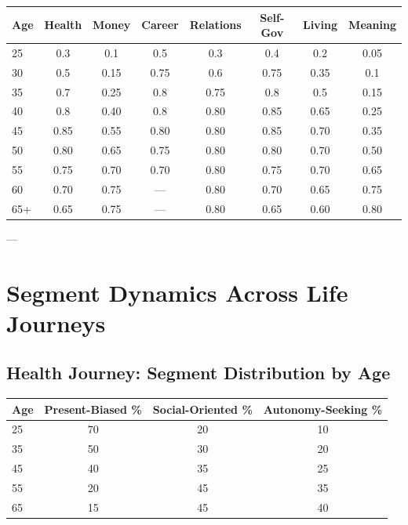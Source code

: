 \begin{center}
\small
\begin{tabular}{@{}p{1.5cm}|ccccccc@{}}
\toprule
\textbf{Age} & \textbf{Health} & \textbf{Money} & \textbf{Career} & \textbf{Relations} & \textbf{Self-Gov} & \textbf{Living} & \textbf{Meaning} \\
\midrule
25 & 0.3 & 0.1 & 0.5 & 0.3 & 0.4 & 0.2 & 0.05 \\
30 & 0.5 & 0.15 & 0.75 & 0.6 & 0.75 & 0.35 & 0.1 \\
35 & 0.7 & 0.25 & 0.8 & 0.75 & 0.8 & 0.5 & 0.15 \\
40 & 0.8 & 0.40 & 0.8 & 0.80 & 0.85 & 0.65 & 0.25 \\
45 & 0.85 & 0.55 & 0.80 & 0.80 & 0.85 & 0.70 & 0.35 \\
50 & 0.80 & 0.65 & 0.75 & 0.80 & 0.80 & 0.70 & 0.50 \\
55 & 0.75 & 0.70 & 0.70 & 0.80 & 0.75 & 0.70 & 0.65 \\
60 & 0.70 & 0.75 & — & 0.80 & 0.70 & 0.65 & 0.75 \\
65+ & 0.65 & 0.75 & — & 0.80 & 0.65 & 0.60 & 0.80 \\
\midrule
\end{tabular}
\end{center}

---


\section{Segment Dynamics Across Life Journeys}
\label{rrr:segments}

\subsection{Health Journey: Segment Distribution by Age}

\begin{center}
\begin{tabular}{@{}lccc@{}}
\toprule
\textbf{Age} & \textbf{Present-Biased \%} & \textbf{Social-Oriented \%} & \textbf{Autonomy-Seeking \%} \\
\midrule
25 & 70 & 20 & 10 \\
35 & 50 & 30 & 20 \\
45 & 40 & 35 & 25 \\
55 & 20 & 45 & 35 \\
65 & 15 & 45 & 40 \\
\midrule
\end{tabular}
\end{center}

